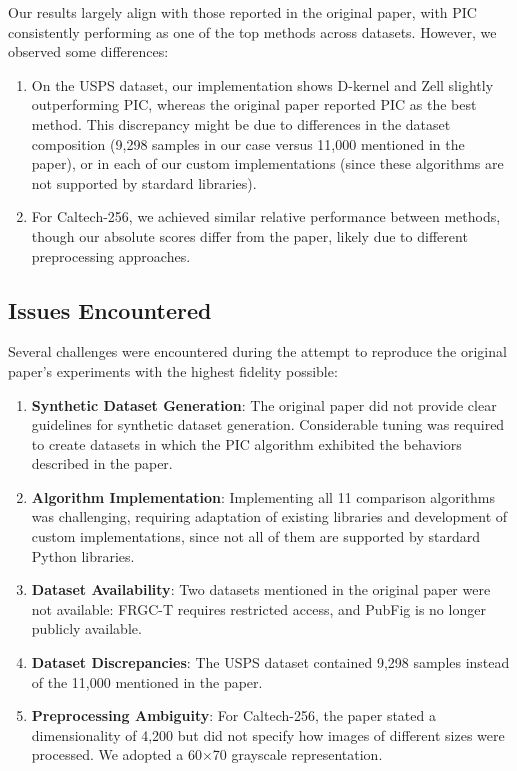 Our results largely align with those reported in the original paper, with PIC consistently performing as one of the top methods across datasets. However, we observed some differences:

\begin{enumerate}
    \item On the USPS dataset, our implementation shows D-kernel and Zell slightly outperforming PIC, whereas the original paper reported PIC as the best method. This discrepancy might be due to differences in the dataset composition (9,298 samples in our case versus 11,000 mentioned in the paper), or in each of our custom implementations (since these algorithms are not supported by stardard libraries).
    
    \item For Caltech-256, we achieved similar relative performance between methods, though our absolute scores differ from the paper, likely due to different preprocessing approaches.
\end{enumerate}

\subsection{Issues Encountered}
Several challenges were encountered during the attempt to reproduce the original paper's experiments with the highest fidelity possible:

\begin{enumerate}
    \item \textbf{Synthetic Dataset Generation}: The original paper did not provide clear guidelines for synthetic dataset generation. Considerable tuning was required to create datasets in which the PIC algorithm exhibited the behaviors described in the paper.
    
    \item \textbf{Algorithm Implementation}: Implementing all 11 comparison algorithms was challenging, requiring adaptation of existing libraries and development of custom implementations, since not all of them are supported by stardard Python libraries.
    
    \item \textbf{Dataset Availability}: Two datasets mentioned in the original paper were not available: FRGC-T requires restricted access, and PubFig is no longer publicly available.
    
    \item \textbf{Dataset Discrepancies}: The USPS dataset contained 9,298 samples instead of the 11,000 mentioned in the paper.
    
    \item \textbf{Preprocessing Ambiguity}: For Caltech-256, the paper stated a dimensionality of 4,200 but did not specify how images of different sizes were processed. We adopted a 60$\times$70 grayscale representation.
\end{enumerate}

